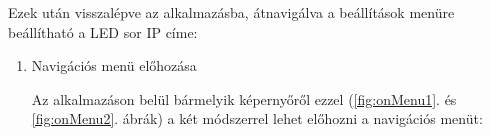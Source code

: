 \documentclass[../main.tex]{subfiles}
\begin{document}
            Ezek után visszalépve az alkalmazásba, átnavigálva a beállítások menüre beállítható a LED sor IP címe:
            
            \begin{enumerate}
                \item Navigációs menü előhozása
                
                    Az alkalmazáson belül bármelyik képernyőről ezzel (\ref{fig:onMenu1}. és \ref{fig:onMenu2}. ábrák) a két módszerrel lehet előhozni a navigációs menüt:
                    \begin{figure}[!h]
                        \begin{floatrow}
                        \end{floatrow}
                    \end{figure}\\
                    

\end{enumerate}
\end{document}
